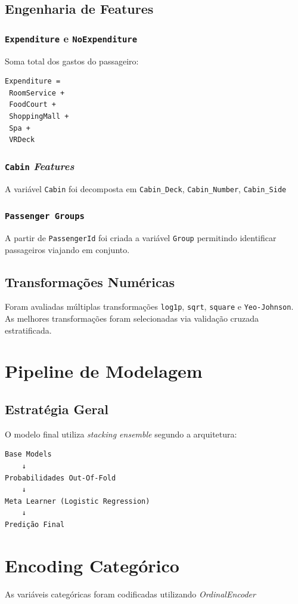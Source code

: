 \documentclass[12pt,a4paper]{article}
\begin{document}
\subsection{Engenharia de Features}
\label{sec:orgc3fabbe}
\subsubsection{\texttt{Expenditure} e \texttt{NoExpenditure}}
\label{sec:org9fcffc5}

Soma total dos gastos do passageiro:
\begin{verbatim}
Expenditure =
 RoomService +
 FoodCourt +
 ShoppingMall +
 Spa +
 VRDeck
\end{verbatim}
\subsubsection{\texttt{Cabin} \emph{Features}}
\label{sec:org876baca}
A variável \texttt{Cabin} foi decomposta em \texttt{Cabin\_Deck}, \texttt{Cabin\_Number}, \texttt{Cabin\_Side}
\subsubsection{\texttt{Passenger Groups}}
\label{sec:orgfe01226}
A partir de \texttt{PassengerId} foi criada a variável \texttt{Group} permitindo identificar passageiros viajando em conjunto.
\subsection{Transformações Numéricas}
\label{sec:orgb6ad77f}
Foram avaliadas múltiplas transformações \texttt{log1p}, \texttt{sqrt}, \texttt{square} e \texttt{Yeo-Johnson}. As melhores transformações foram selecionadas via validação cruzada estratificada.
\section{Pipeline de Modelagem}
\label{sec:orga8b9b12}
\subsection{Estratégia Geral}
\label{sec:org23b0f3e}
O modelo final utiliza \emph{stacking ensemble} segundo a arquitetura:

\begin{verbatim}
Base Models
    ↓
Probabilidades Out-Of-Fold
    ↓
Meta Learner (Logistic Regression)
    ↓
Predição Final
\end{verbatim}
\section{Encoding Categórico}
\label{sec:orga0af9a7}
As variáveis categóricas foram codificadas utilizando \emph{OrdinalEncoder}
\end{document}
